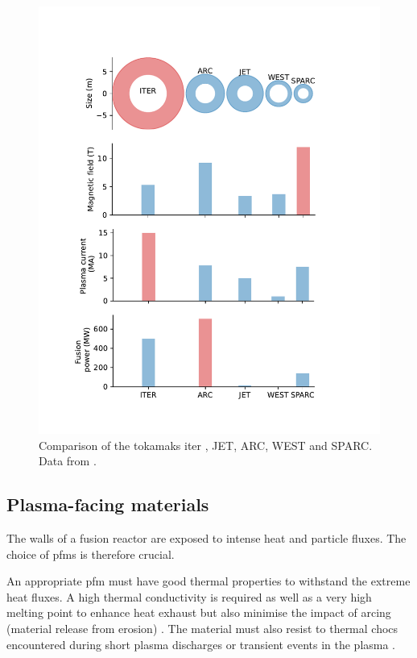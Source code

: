 \begin{figure}
    \includegraphics[width=0.9\linewidth]{Figures/Chapter1/comparison_reactors.pdf}
    \caption{Comparison of the tokamaks \acrshort{iter} , JET, ARC, WEST and SPARC. Data from \cite{delaporte-mathurin_remdelaportemathurinfusion-world_2022}.}
\end{figure}

\subsection{Plasma-facing materials}

The walls of a fusion reactor are exposed to intense heat and particle fluxes.
The choice of \glspl{pfm} is therefore crucial.

An appropriate \gls{pfm} must have good thermal properties to withstand the extreme heat fluxes.
A high thermal conductivity is required as well as a very high melting point to enhance heat exhaust but also minimise the impact of arcing (material release from erosion) .
The material must also resist to thermal chocs encountered during short \gls{plasma} discharges or transient events in the \gls{plasma} .

